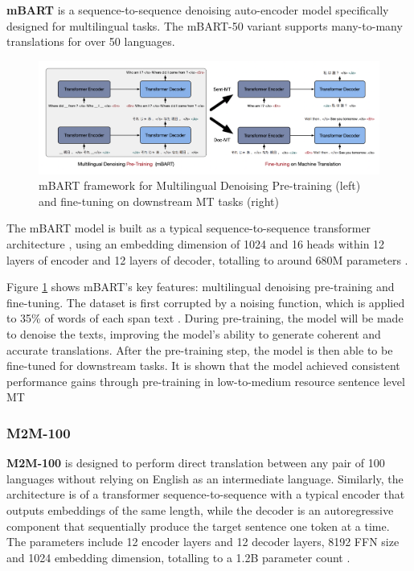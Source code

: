 \documentclass[a4paper]{article}
\begin{document}
\textbf{mBART} \cite{liu-2020-mbart} is a sequence-to-sequence denoising auto-encoder model specifically designed for multilingual tasks. The mBART-50 variant supports many-to-many translations for over 50 languages.

\begin{figure}[htbp]
    \centering
    \includegraphics[width=0.9\linewidth]{images/mbart.png}
    \caption{mBART framework for Multilingual Denoising Pre-training (left) and fine-tuning on downstream MT tasks
        (right) \cite{liu-2020-mbart}}
    \label{fig:mbart}
\end{figure}

The mBART model is built as a typical sequence-to-sequence transformer architecture \cite{vaswani-2017-attention}, using an embedding dimension of 1024 and 16 heads within 12 layers of encoder and 12 layers of decoder, totalling to around 680M parameters \cite{liu-2020-mbart}.

Figure \ref{fig:mbart} shows  mBART's key features: multilingual denoising pre-training and fine-tuning. The dataset is first corrupted by a noising function, which is applied to 35\% of words of each span text \cite{liu-2020-mbart}. During pre-training, the model will be made to denoise the texts, improving the model's ability to generate coherent and accurate translations. After the pre-training step, the model is then able to be fine-tuned for downstream tasks. It is shown that the model achieved consistent performance gains through pre-training in low-to-medium resource sentence level MT \cite{liu-2020-mbart}

\subsubsection{M2M-100}

\textbf{M2M-100} \cite{fan-2020-m2m100} is designed to perform direct translation between any pair of 100 languages without relying on English as an intermediate language. Similarly, the architecture is of a transformer sequence-to-sequence with a typical encoder that outputs embeddings of the same length, while the decoder is an autoregressive component that sequentially produce the target sentence one token at a time. The parameters include 12 encoder layers and 12 decoder layers, 8192 FFN size and 1024 embedding dimension, totalling to a 1.2B parameter count \cite{fan-2020-m2m100}.
\end{document}
